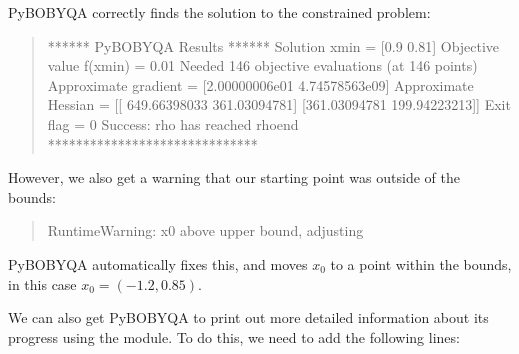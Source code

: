 \documentclass[letterpaper,10pt,english]{sphinxmanual}
\begin{document}
Py\sphinxhyphen{}BOBYQA correctly finds the solution to the constrained problem:
\begin{quote}

\begin{sphinxVerbatim}[commandchars=\\\{\}]
****** Py\PYGZhy{}BOBYQA Results ******
Solution xmin = [0.9  0.81]
Objective value f(xmin) = 0.01
Needed 146 objective evaluations (at 146 points)
Approximate gradient = [\PYGZhy{}2.00000006e\PYGZhy{}01 \PYGZhy{}4.74578563e\PYGZhy{}09]
Approximate Hessian = [[ 649.66398033 \PYGZhy{}361.03094781]
 [\PYGZhy{}361.03094781  199.94223213]]
Exit flag = 0
Success: rho has reached rhoend
******************************
\end{sphinxVerbatim}
\end{quote}

However, we also get a warning that our starting point was outside of the bounds:
\begin{quote}

\begin{sphinxVerbatim}[commandchars=\\\{\}]
RuntimeWarning: x0 above upper bound, adjusting
\end{sphinxVerbatim}
\end{quote}

Py\sphinxhyphen{}BOBYQA automatically fixes this, and moves \(x_0\) to a point within the bounds, in this case \(x_0=(-1.2,0.85)\).

We can also get Py\sphinxhyphen{}BOBYQA to print out more detailed information about its progress using the  module. To do this, we need to add the following lines:
\begin{quote}

\begin{sphinxVerbatim}[commandchars=\\\{\}]
 
 

\end{sphinxVerbatim}
\end{quote}
\end{document}
